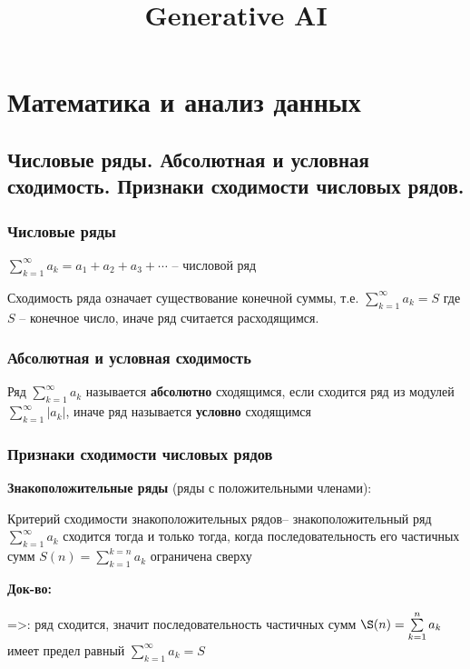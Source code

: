 \documentclass{article}
\title{Generative AI} %
\begin{document}
\maketitle %
\section{Математика и анализ данных}

\subsection{Числовые ряды. Абсолютная и условная сходимость. Признаки сходимости числовых рядов.}

\subsubsection{Числовые ряды}

$\sum\limits_{k=1}^{\infty} a_{k} = a_{1} + a_{2} + a_{3} + \cdots$ -- числовой ряд

Сходимость ряда означает существование конечной суммы, т.е. $\sum\limits_{k=1}^{\infty} a_{k} = S$ где $S$ -- конечное число, иначе ряд считается расходящимся.

\subsubsection{Абсолютная и условная сходимость}

Ряд $\sum\limits_{k=1}^{\infty} a_{k}$ называется {\bf абсолютно} сходящимся, если сходится ряд из модулей $\sum\limits_{k=1}^{\infty} |a_{k}|$, иначе ряд называется {\bf условно} сходящимся

\subsubsection{Признаки сходимости числовых рядов} 

{\bf Знакоположительные ряды} (ряды с положительными членами):

Критерий сходимости знакоположительных рядов-- знакоположительный ряд $\sum\limits_{k=1}^{\infty} a_{k}$ сходится тогда и только тогда, когда последовательность его частичных сумм $S(n) = \sum\limits_{k=1}^{k=n}a_{k}$ ограничена сверху

{\bf Док-во:}

=>: ряд сходится, значит последовательность частичных сумм $\S(n) =\sum\limits_{k=1}^{n} a_{k}$ имеет предел равный $\sum\limits_{k=1}^{\infty} a_{k} = S$
\end{document}
